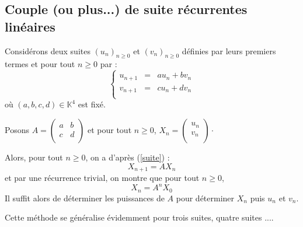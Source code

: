 \documentclass[a4paper,10pt]{report}
\begin{document}
\subsection{Couple (ou plus...) de suite récurrentes linéaires}
\noindent Considérons deux suites $(u_n)_{n \geq 0}$ et $(v_n)_{n \geq 0}$ définies par leurs premiers termes et pour tout $n \geq 0$ par :
\begin{equation}\label{suite}
 \left\lbrace \begin{array}{ccl}
u_{n+1} & = & a u_n + b v_n \\
v_{n+1} & = & c u_n + dv_n \\
\end{array}\right.
\end{equation}
où $(a,b,c,d) \in \mathbb{K}^4$ est fixé. 

\medskip

\noindent Posons $A = \begin{pmatrix}
a & b \\
c & d \\
\end{pmatrix}$ et pour tout $n \geq 0$, $X_n = \begin{pmatrix}
u_n \\
v_n \\
\end{pmatrix} \cdot$

\medskip

\noindent Alors, pour tout $n \geq 0$, on a d'après (\ref{suite}) :
$$ X_{n+1}=A X_n$$
et par une récurrence trivial, on montre que pour tout $n \geq 0$,
$$ X_n = A^n X_0$$
Il suffit alors de déterminer les puissances de $A$ pour déterminer $X_n$ puis $u_n$ et $v_n$.

\medskip

\noindent Cette méthode se généralise évidemment pour trois suites, quatre suites ....

\medskip
\end{document}
